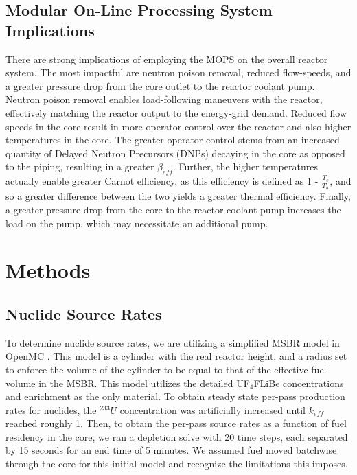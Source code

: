 \documentclass{anstrans}
\begin{document}
\subsection{Modular On-Line Processing System Implications}\label{ompsI}
There are strong implications of employing the MOPS on the overall reactor system. The most impactful are neutron poison removal, reduced flow-speeds, and a greater pressure drop from the core outlet to the reactor coolant pump. Neutron poison removal enables load-following maneuvers with the reactor, effectively matching the reactor output to the energy-grid demand. Reduced flow speeds in the core result in more operator control over the reactor and also higher temperatures in the core. The greater operator control stems from an increased quantity of Delayed Neutron Precursors (DNPs) decaying in the core as opposed to the piping, resulting in a greater $\beta_{eff}$. Further, the higher temperatures actually enable greater Carnot efficiency, as this efficiency is defined as 1 - $\frac{T_c}{T_h}$, and so a greater difference between the two yields a greater thermal efficiency. Finally, a greater pressure drop from the core to the reactor coolant pump increases the load on the pump, which may necessitate an additional pump. 


\section{Methods}
\subsection{Nuclide Source Rates}
To determine nuclide source rates, we are utilizing a simplified MSBR \cite{msbrreprocessing} model in OpenMC \cite{OpenMC}. This model is a cylinder with the real reactor height, and a radius set to enforce the volume of the cylinder to be equal to that of the effective fuel volume in the MSBR. This model utilizes the detailed UF$_4$FLiBe concentrations and enrichment as the only material. To obtain steady state per-pass production rates for nuclides, the $^{233}U$ concentration was artificially increased until $k_{eff}$ reached roughly 1. Then, to obtain the per-pass source rates as a function of fuel residency in the core, we ran a depletion solve with 20 time steps, each separated by 15 seconds for an end time of 5 minutes. We assumed fuel moved batchwise through the core for this initial model and recognize the limitations this imposes.
\end{document}
